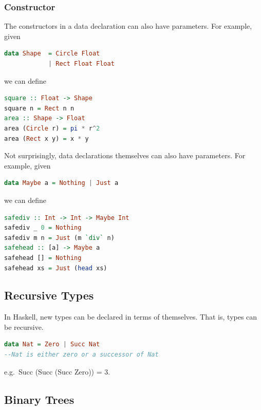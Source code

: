\hypertarget{constructor}{%
\subsubsection{Constructor}\label{constructor}}

The constructors in a data declaration can also have parameters. For
example, given

\begin{lstlisting}[language=Haskell]
data Shape  = Circle Float
            | Rect Float Float
\end{lstlisting}

we can define

\begin{lstlisting}[language=Haskell]
square :: Float -> Shape
square n = Rect n n
area :: Shape -> Float
area (Circle r) = pi * r^2
area (Rect x y) = x * y
\end{lstlisting}

Not surprisingly, data declarations themselves can also have parameters.
For example, given

\begin{lstlisting}[language=Haskell]
data Maybe a = Nothing | Just a
\end{lstlisting}

we can define

\begin{lstlisting}[language=Haskell]
safediv :: Int -> Int -> Maybe Int
safediv _ 0 = Nothing
safediv m n = Just (m `div` n)
safehead :: [a] -> Maybe a
safehead [] = Nothing
safehead xs = Just (head xs)
\end{lstlisting}

\hypertarget{recursive-types}{%
\subsection{Recursive Types}\label{recursive-types}}

In Haskell, new types can be declared in terms of themselves. That is,
types can be recursive.

\begin{lstlisting}[language=Haskell]
data Nat = Zero | Succ Nat
--Nat is either zero or a successor of Nat
\end{lstlisting}

e.g.~Succ (Succ (Succ Zero)) = 3.

\hypertarget{binary-trees}{%
\subsection{Binary Trees}\label{binary-trees}}

